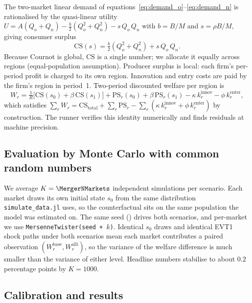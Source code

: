 \documentclass[12pt]{article}
\begin{document}
The two-market linear demand of
equations~\eqref{eq:demand_o}--\eqref{eq:demand_n} is rationalised by the
quasi-linear utility $U = A(Q_o + Q_n) - \tfrac{b}{2}(Q_o^2 + Q_n^2) - s\,
Q_o\, Q_n$ with $b = B/M$ and $s = \rho B/M$, giving consumer surplus
\begin{equation}
  \mathrm{CS}(s) = \tfrac{b}{2}(Q_o^2 + Q_n^2) + s\, Q_o\, Q_n.
  \label{eq:cs}
\end{equation}
Because Cournot is global, $\mathrm{CS}$ is a single number; we allocate
it equally across regions (equal-population assumption). Producer surplus
is local: each firm's per-period profit is charged to its own region.
Innovation and entry costs are paid by the firm's region in period~1.
Two-period discounted welfare per region is
\begin{equation}
  W_r
    = \tfrac{1}{R}\bigl[\mathrm{CS}(s_0) + \beta\,\mathrm{CS}(s_1)\bigr]
    + \mathrm{PS}_r(s_0) + \beta\,\mathrm{PS}_r(s_1)
    - \kappa\, k^{\mathrm{innov}}_r - \phi\, k^{\mathrm{enter}}_r,
  \label{eq:welfare}
\end{equation}
which satisfies $\sum_r W_r = \mathrm{CS}_{\mathrm{total}} +
\sum_r \mathrm{PS}_r - \sum_r (\kappa\, k^{\mathrm{innov}}_r +
\phi\, k^{\mathrm{enter}}_r)$ by construction. The runner verifies this
identity numerically and finds residuals at machine precision.

\subsection{Evaluation by Monte Carlo with common random numbers}

We average $K = \MergerNMarkets$ independent simulations per scenario.
Each market draws its own initial state $s_0$ from the same distribution
\texttt{simulate\_data.jl} uses, so the counterfactual sits on the same
population the model was estimated on. The same seed (\MergerSeed) drives
both scenarios, and per-market we use \texttt{MersenneTwister(seed + $k$)}.
Identical $s_0$ draws and identical EVT1 shock paths under both scenarios
mean each market contributes a paired observation
$(W_r^{\mathrm{base}}, W_r^{\mathrm{alli}})$, so the variance of the
welfare difference is much smaller than the variance of either level.
Headline numbers stabilise to about $0.2$ percentage points by $K = 1000$.

\subsection{Calibration and results}
\end{document}
